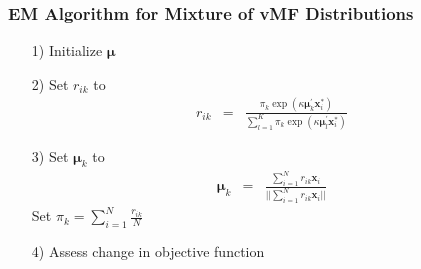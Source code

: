 \documentclass{beamer}
\numberwithin{equation}{section}
\begin{document}
\begin{frame}
\frametitle{EM Algorithm for Mixture of vMF Distributions}

\begin{itemize}
\item[1)] Initialize $\boldsymbol{\mu}$
\item[2)] Set $r_{ik}$ to 
\begin{eqnarray}
r_{ik} & = & \frac{ \pi_{k} \exp(\kappa \boldsymbol{\mu}_{k}^{'}\boldsymbol{x}_{i}^{*})  }{ \sum_{l=1}^{K} \pi_{k} \exp(\kappa \boldsymbol{\mu}_{l}^{'}\boldsymbol{x}_{i}^{*})  } \nonumber 
\end{eqnarray}
\item[3)] Set $\boldsymbol{\mu}_{k}$ to 
\begin{eqnarray}
\boldsymbol{\mu}_{k} & = & \frac{\sum_{i=1}^{N} r_{ik} \boldsymbol{x}_{i}  }{||\sum_{i=1}^{N} r_{ik} \boldsymbol{x}_{i}|| } \nonumber 
\end{eqnarray}
Set $\pi_{k} = \sum_{i=1}^{N} \frac{ r_{ik} }{ N }$
\item[4)] Assess change in objective function
\end{itemize}



\end{frame}
\end{document}
